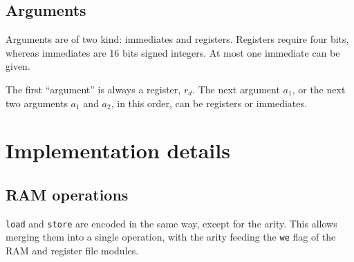 \documentclass{scrartcl}
\begin{document}
\subsection*{Arguments}
Arguments are of two kind: immediates and registers. Registers require four bits,
whereas immediates are 16 bits signed integers. At most one immediate can be
given.\par
The first ``argument'' is always a register, $r_d$. The next argument $a_1$, or
the next two arguments $a_1$ and $a_2$, in this order, can be registers or
immediates.

\section*{Implementation details}
\subsection*{RAM operations}
\verb|load| and \verb|store| are encoded in the same way, except for the arity. This
allows merging them into a single operation, with the arity feeding the \verb|we|
flag of the RAM and register file modules.
\end{document}
